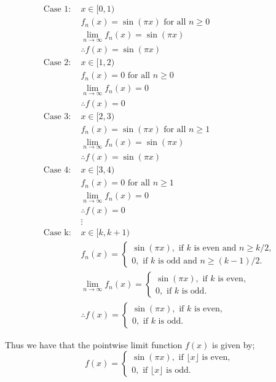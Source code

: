 \documentclass{tufte-handout}
\begin{document}
\begin{question}
\begin{align*}
\text{Case 1: } & x \in [0,1) \\
& f_n(x) = \sin(\pi x) \text{ for all } n \geq 0 \\
& \lim\limits_{n \to \infty} f_n(x) = \sin(\pi x) \\
& \therefore f(x) = \sin(\pi x) \\[12pt]
\text{Case 2: } & x \in [1,2) \\
& f_n(x) = 0 \text{ for all } n \geq 0 \\
& \lim\limits_{n \to \infty} f_n(x) = 0 \\
& \therefore f(x) = 0 \\[12pt]
\text{Case 3: } & x \in [2,3) \\
& f_n(x) = \sin(\pi x) \text{ for all } n \geq 1 \\
& \lim\limits_{n \to \infty} f_n(x) = \sin(\pi x) \\
& \therefore f(x) = \sin(\pi x) \\[12pt]
\text{Case 4: } & x \in [3,4) \\
& f_n(x) = 0 \text{ for all } n \geq 1 \\
& \lim\limits_{n \to \infty} f_n(x) = 0 \\
& \therefore f(x) = 0 \\[12pt]
& \vdots \\[12pt]
\text{Case k: } & x \in [k, k+1) \\
& f_n(x) = 
\begin{cases}
\sin(\pi x), \text{ if } k \text{ is even and } n \geq k/2,\\
0, \text{ if } k \text{ is odd and } n \geq (k-1)/2.
\end{cases} \\
& \lim\limits_{n \to \infty} f_n(x) = 
\begin{cases}
\sin(\pi x), \text{ if } k \text{ is even},\\
0, \text{ if } k \text{ is odd. }
\end{cases} \\
& \therefore f(x) = 
\begin{cases}
\sin(\pi x), \text{ if } k \text{ is even},\\
0, \text{ if } k \text{ is odd. }
\end{cases}     
\end{align*}

Thus we have that the pointwise limit function \( f(x) \) is given by;
\begin{equation*}
f(x) = 
\begin{cases}
\sin(\pi x), \text{ if } \lfloor x \rfloor \text{ is even},\\
0, \text{ if } \lfloor x \rfloor \text{ is odd. }
\end{cases}
\end{equation*} 



\vspace{3cm}

\qpart



\end{question}
\end{document}
